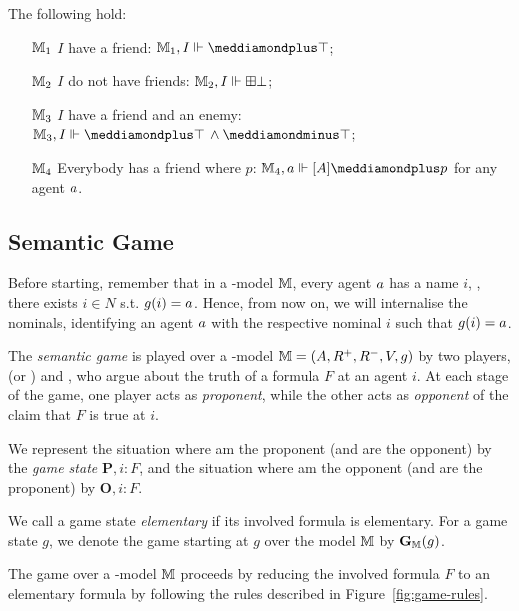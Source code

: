 \begin{example}
\begin{center}
\begin{tikzpicture}[x=0.75pt,y=0.75pt,yscale=-1,xscale=1]
\end{tikzpicture}

\end{center}
The following hold:
\begin{itemize}
\item[$\M_1$] $I$ have a friend: $\M_1, I \Vdash \dplus\top$;
\item[$\M_2$] $I$ do not have friends: $\M_2, I \Vdash \bplus\bot$;
\item[$\M_3$] $I$ have a friend and an enemy: $\M_3, I \Vdash \dplus \top\,\wedge \dminus\top$;
\item[$\M_4$] Everybody has a friend where $p$: $\M_4, \ag \Vdash  [A ]  \dplus p$ for any agent $\ag$.
\end{itemize} 
 \end{example}


\subsection{Semantic Game}\label{sec:game-semantics}
Before starting, remember that in a \PNL-model $\M$, every agent $\ag$ has a name $i$, \ie, there exists $i\in N$ s.t. $\g(i)=\ag$. Hence, from now on, we will internalise the nominals, identifying an agent $\ag$ with the respective nominal $i$ such that $\g(i)=\ag$.

The  \emph{semantic game} is played over a \PNL-model $\M=(\A,\R^+,\R^-,\V,\g)$ by two
players, \Me (or \Ic) and \You, who argue about the truth of a formula $ F $ at an
agent $i$. At each stage of the game, one player acts as \emph{proponent}, while the
other acts as \emph{opponent} of the claim that  $ F $ is true at 
$i$. 

We represent the situation where \Ic am the proponent (and \You are the
opponent) by the \emph{game state} $\mathbf{P}, i: F $, and the situation
where \Ic am the opponent (and \You are the proponent) by $\mathbf{O},
i: F $. 

We call a game state \emph{elementary} if its involved formula is elementary. For a game state $g$, we denote the game starting at $g$ over the model $\M$ by $\mathbf{G}_\M(g)$.

The game over a \PNL-model $\M$ proceeds by reducing the involved formula $ F $ to an elementary formula by following the rules described in Figure~\ref{fig:game-rules}.



